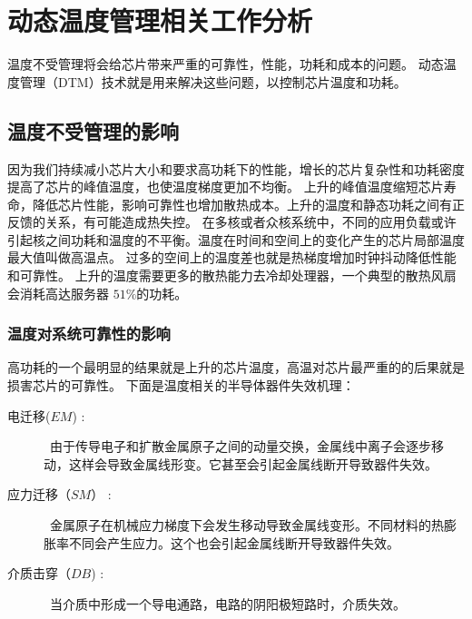 
\chapter{动态温度管理相关工作分析}


温度不受管理将会给芯片带来严重的可靠性，性能，功耗和成本的问题。
动态温度管理（DTM）技术就是用来解决这些问题，以控制芯片温度和功耗。




\section{温度不受管理的影响}\label{sec:adverse}

因为我们持续减小芯片大小和要求高功耗下的性能，增长的芯片复杂性和功耗密度提高了芯片的峰值温度，也使温度梯度更加不均衡。
上升的峰值温度缩短芯片寿命，降低芯片性能，影响可靠性也增加散热成本\cite{skadron:TACO'04}。上升的温度和静态功耗之间有正反馈的关系，有可能造成热失控。
在多核或者众核系统中，不同的应用负载或许引起核之间功耗和温度的不平衡。温度在时间和空间上的变化产生的芯片局部温度最大值叫做高温点\cite{Donald:ISCA'06}。
过多的空间上的温度差也就是热梯度增加时钟抖动降低性能和可靠性。
上升的温度需要更多的散热能力去冷却处理器，一个典型的散热风扇会消耗高达服务器 $51\%$的功耗\cite{lefurgy2003energy}\cite{ayoub2010gentlecool}。

\subsection{温度对系统可靠性的影响}\label{sec:reliability}
高功耗的一个最明显的结果就是上升的芯片温度，高温对芯片最严重的的后果就是损害芯片的可靠性。
下面是温度相关的半导体器件失效机理\cite{jedec2003failure}：
\begin{description}
\item[电迁移($EM$) :] ~由于传导电子和扩散金属原子之间的动量交换，金属线中离子会逐步移动，这样会导致金属线形变。它甚至会引起金属线断开导致器件失效。
\item[应力迁移（$SM$） :] ~金属原子在机械应力梯度下会发生移动导致金属线变形。不同材料的热膨胀率不同会产生应力。这个也会引起金属线断开导致器件失效。
\item[介质击穿（$DB$) :] ~当介质中形成一个导电通路，电路的阴阳极短路时，介质失效。
\end{description}

